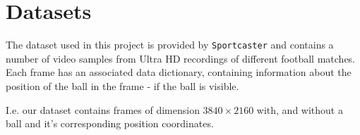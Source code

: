 \section{Datasets}

The dataset used in this project is provided by \texttt{Sportcaster}
and contains a number of video samples from Ultra HD recordings of
different football matches. Each frame has an associated data
dictionary, containing information about the position of the ball in
the frame - if the ball is visible.

I.e. our dataset contains frames of dimension $3840 \times 2160$ with,
and without a ball and it's corresponding position coordinates.
